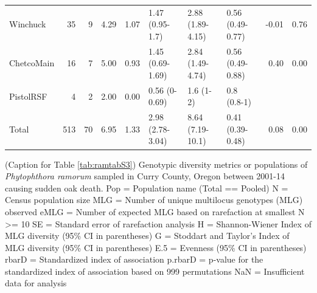 \documentclass[double,12pt]{beavtex}
\begin{document}
\begin{table}
\begin{tabular}{lrrrrlllrr}
    Winchuck &  35 &   9 & 4.29 & 1.07 & 1.47 (0.95-1.7) & 2.88 (1.89-4.15) & 0.56 (0.49-0.77) & -0.01 & 0.76 \\ 
    ChetcoMain &  16 &   7 & 5.00 & 0.93 & 1.45 (0.69-1.69) & 2.84 (1.49-4.74) & 0.56 (0.49-0.88) & 0.40 & 0.00 \\ 
    PistolRSF &   4 &   2 & 2.00 & 0.00 & 0.56 (0-0.69) & 1.6 (1-2) & 0.8 (0.8-1) &  &  \\ 
    Total & 513 &  70 & 6.95 & 1.33 & 2.98 (2.78-3.04) & 8.64 (7.19-10.1) & 0.41 (0.39-0.48) & 0.08 & 0.00 \\ 
     \bottomrule
  \end{tabular}
  \end{table}
  
  \newpage
  
  \renewcommand{\tablename}{Supplementary Table Caption}
  \renewcommand{\thetable}{\arabic{chapter}.C\arabic{table}}
  
  \addtocounter{table}{-1}
  
  \vspace*{\fill}
  
  \begin{table}[ph!]
  \caption[Caption for Table \ref{tab:ramtabS3}]{(Caption for Table 
  \ref{tab:ramtabS3}) Genotypic diversity metrics or populations of
  \textit{Phytophthora ramorum} sampled in Curry County, Oregon between 2001-14
  causing sudden oak death. Pop = Population name (Total == Pooled)
  N = Census population size
  MLG = Number of unique multilocus genotypes (MLG) observed
  eMLG = Number of expected MLG based on rarefaction at smallest N >= 10
  SE = Standard error of rarefaction analysis
  H = Shannon-Wiener Index of MLG diversity (95\% CI in parentheses)
  G = Stoddart and Taylor's Index of MLG diversity (95\% CI in parentheses)
  E.5 = Evenness (95\% CI in parentheses)
  rbarD = Standardized index of association
  p.rbarD = p-value for the standardized index of association based on 999 permutations
  NaN = Insufficient data for analysis}
  \label{cap:ramcapS3}
  \end{table}\vspace*{\fill}
  
  \renewcommand{\tablename}{Supplementary Table}
  \renewcommand{\thetable}{\arabic{chapter}.S\arabic{table}}
  
  
  \newpage
  
  \renewcommand{\figurename}{Figure}
  \renewcommand{\tablename}{Table}
  \renewcommand{\thefigure}{\arabic{chapter}.\arabic{figure}}
  \renewcommand{\thetable}{\arabic{chapter}.\arabic{table}}
  
\end{document}
